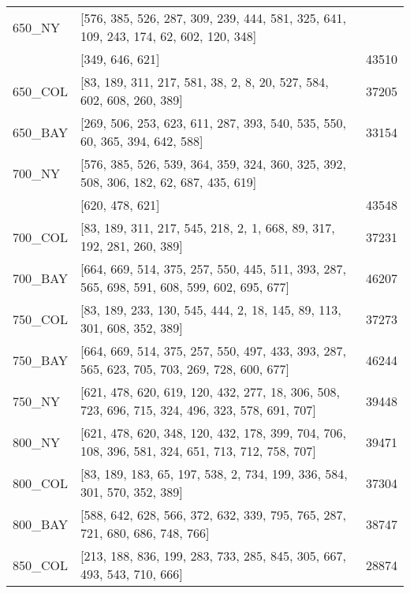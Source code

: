 \documentclass[main.tex]{subfiles}
\begin{document}
\begin{center}
\begin{tabular}{llr}
650\_NY & [576, 385, 526, 287, 309, 239, 444, 581, 325, 641, 109, 243, 174, 62, 602, 120, 348]\\ & [349, 646, 621] & 43510\\
650\_COL & [83, 189, 311, 217, 581, 38, 2, 8, 20, 527, 584, 602, 608, 260, 389] & 37205\\
650\_BAY & [269, 506, 253, 623, 611, 287, 393, 540, 535, 550, 60, 365, 394, 642, 588] & 33154\\
700\_NY & [576, 385, 526, 539, 364, 359, 324, 360, 325, 392, 508, 306, 182, 62, 687, 435, 619]\\ & [620, 478, 621] & 43548\\
700\_COL & [83, 189, 311, 217, 545, 218, 2, 1, 668, 89, 317, 192, 281, 260, 389] & 37231\\
700\_BAY & [664, 669, 514, 375, 257, 550, 445, 511, 393, 287, 565, 698, 591, 608, 599, 602, 695, 677] & 46207\\
750\_COL & [83, 189, 233, 130, 545, 444, 2, 18, 145, 89, 113, 301, 608, 352, 389] & 37273\\
750\_BAY & [664, 669, 514, 375, 257, 550, 497, 433, 393, 287, 565, 623, 705, 703, 269, 728, 600, 677] & 46244\\
750\_NY & [621, 478, 620, 619, 120, 432, 277, 18, 306, 508, 723, 696, 715, 324, 496, 323, 578, 691, 707] & 39448\\
800\_NY & [621, 478, 620, 348, 120, 432, 178, 399, 704, 706, 108, 396, 581, 324, 651, 713, 712, 758, 707] & 39471\\
800\_COL & [83, 189, 183, 65, 197, 538, 2, 734, 199, 336, 584, 301, 570, 352, 389] & 37304\\
800\_BAY & [588, 642, 628, 566, 372, 632, 339, 795, 765, 287, 721, 680, 686, 748, 766] & 38747\\
850\_COL & [213, 188, 836, 199, 283, 733, 285, 845, 305, 667, 493, 543, 710, 666] & 28874\\
\hline\end{tabular}
\end{center}
\newpage
\end{document}
